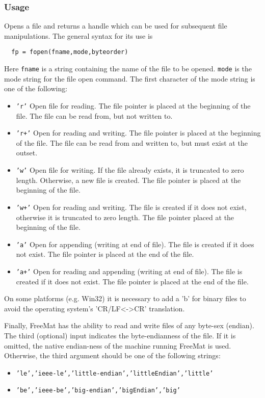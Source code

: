 \subsubsection{Usage}
Opens a file and returns a handle which can be used for subsequent
file manipulations.  The general syntax for its use is
\begin{verbatim}
  fp = fopen(fname,mode,byteorder)
\end{verbatim}
Here \verb|fname| is a string containing the name of the file to be 
opened.  \verb|mode| is the mode string for the file open command.
The first character of the mode string is one of the following:
\begin{itemize}
  \item \texttt{'r'}  Open  file  for  reading.  The file pointer is placed at
          the beginning of the file.  The file can be read from, but
	  not written to.
  \item \texttt{'r+'}   Open for reading and writing.  The file pointer is
          placed at the beginning of the file.  The file can be read
	  from and written to, but must exist at the outset.
  \item \texttt{'w'}    Open file for writing.  If the file already exists, it is
          truncated to zero length.  Otherwise, a new file is
	  created.  The file pointer is placed at the beginning of
	  the file.
  \item \texttt{'w+'}   Open for reading and writing.  The file is created  if  
          it  does not  exist, otherwise it is truncated to zero
	  length.  The file pointer placed at the beginning of the file.
  \item \texttt{'a'}    Open for appending (writing at end of file).  The file  is  
          created  if it does not exist.  The file pointer is placed at
	  the end of the file.
  \item \texttt{'a+'}   Open for reading and appending (writing at end of file).   The
          file  is created if it does not exist.  The file pointer is
	  placed at the end of the file.
\end{itemize}
On some platforms (e.g. Win32) it is necessary to add a 'b' for 
binary files to avoid the operating system's 'CR/LF<->CR' translation.

Finally, FreeMat has the ability to read and write files of any
byte-sex (endian).  The third (optional) input indicates the 
byte-endianness of the file.  If it is omitted, the native endian-ness
of the machine running FreeMat is used.  Otherwise, the third
argument should be one of the following strings:
\begin{itemize}
   \item \texttt{'le','ieee-le','little-endian','littleEndian','little'}
   \item \texttt{'be','ieee-be','big-endian','bigEndian','big'}
\end{itemize}
	
